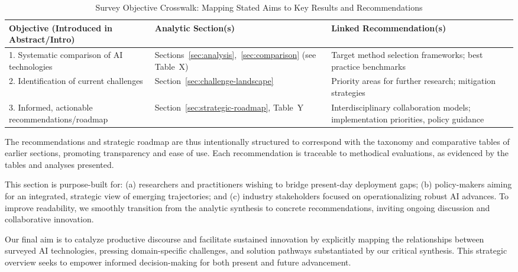 \documentclass[sigconf]{acmart}
\begin{document}
\begin{table*}[htbp]
\centering
\caption{Survey Objective Crosswalk: Mapping Stated Aims to Key Results and Recommendations}
\label{tab:objective-crosswalk}
\begin{adjustbox}{max width=\textwidth}
\begin{tabular}{@{}lll@{}}
\toprule
\textbf{Objective (Introduced in Abstract/Intro)} & \textbf{Analytic Section(s)} & \textbf{Linked Recommendation(s)} \\
\midrule
1. Systematic comparison of AI technologies    & Sections~\ref{sec:analysis},~\ref{sec:comparison} (see Table~X) & Target method selection frameworks; best practice benchmarks \\
2. Identification of current challenges        & Section~\ref{sec:challenge-landscape}                        & Priority areas for further research; mitigation strategies \\
3. Informed, actionable recommendations/roadmap & Section~\ref{sec:strategic-roadmap}, Table~Y                  & Interdisciplinary collaboration models; implementation priorities, policy guidance \\
\bottomrule
\end{tabular}
\end{adjustbox}
\end{table*}

\vspace{0.5em}
The recommendations and strategic roadmap are thus intentionally structured to correspond with the taxonomy and comparative tables of earlier sections, promoting transparency and ease of use. Each recommendation is traceable to methodical evaluations, as evidenced by the tables and analyses presented.

This section is purpose-built for: (a) researchers and practitioners wishing to bridge present-day deployment gaps; (b) policy-makers aiming for an integrated, strategic view of emerging trajectories; and (c) industry stakeholders focused on operationalizing robust AI advances. To improve readability, we smoothly transition from the analytic synthesis to concrete recommendations, inviting ongoing discussion and collaborative innovation. 

Our final aim is to catalyze productive discourse and facilitate sustained innovation by explicitly mapping the relationships between surveyed AI technologies, pressing domain-specific challenges, and solution pathways substantiated by our critical synthesis. This strategic overview seeks to empower informed decision-making for both present and future advancement.
\end{document}
